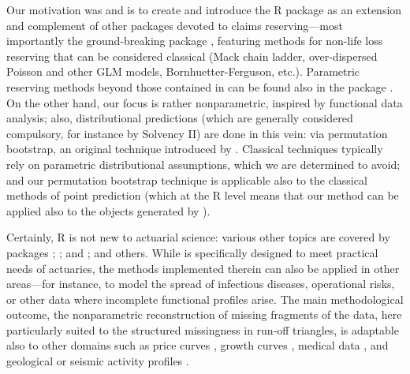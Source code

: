 Our motivation was and is to create and introduce the R package  as an extension and complement of other packages devoted to claims reserving---most importantly the ground-breaking package   \citep{Rchainladder}, featuring methods for non-life loss reserving that can be considered classical (Mack chain ladder, over-dispersed Poisson and other GLM models, Bornhuetter-Ferguson, etc.). 
Parametric reserving methods beyond those contained in  can be found also in the package  \citep{NetSimR}. On the other hand, our focus is rather nonparametric, inspired by functional data analysis; also, distributional predictions (which are generally considered compulsory, for instance by Solvency II) are done in this vein: via permutation bootstrap, an original technique introduced by \citet{MMP2022}. Classical techniques typically rely on parametric distributional assumptions, which we are determined to avoid; and our permutation bootstrap technique is applicable also to the classical methods of point prediction (which at the R level means that our  method can be applied also to the objects generated by ).     

Certainly, R is not new to actuarial science: various other topics are covered by packages   \citep[][actuarial reporting]{actuaryr};  \citep[][life contingencies]{JSSv055i10};   and  \citep[][credibility models]{JSSv025i07,actuaRE}; and others. While  is specifically designed to meet practical needs of actuaries, the methods implemented therein can also be applied in other areas---for instance, to model the spread of infectious diseases, operational risks, or other data where incomplete functional profiles arise. The main methodological outcome, the nonparametric reconstruction of missing fragments of the data, here particularly suited to the structured missingness in run-off triangles, is adaptable also to other domains such as price curves \citep{LieblRameseder}, growth curves \citep{delaigle2013, delaigle2016}, medical data \citep{galmiche2016}, and geological or seismic activity profiles \citep{bauer2021}. 

